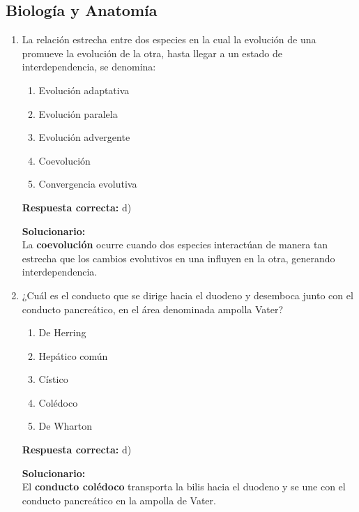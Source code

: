 \subsection*{Biología y Anatomía}

\begin{enumerate}
	
	\item La relación estrecha entre dos especies en la cual la evolución de una promueve la evolución de la otra, hasta llegar a un estado de interdependencia, se denomina:
	\begin{enumerate}[label=\alph*)]
		\item Evolución adaptativa
		\item Evolución paralela
		\item Evolución advergente
		\item Coevolución
		\item Convergencia evolutiva
	\end{enumerate}
	\textbf{Respuesta correcta:} d)
	
	\vspace{2mm}
	\textbf{Solucionario:}\\
	La \textbf{coevolución} ocurre cuando dos especies interactúan de manera tan estrecha que los cambios evolutivos en una influyen en la otra, generando interdependencia.
	
	\vspace{6mm}
	
	\item ¿Cuál es el conducto que se dirige hacia el duodeno y desemboca junto con el conducto pancreático, en el área denominada ampolla Vater?
	\begin{enumerate}[label=\alph*)]
		\item De Herring
		\item Hepático común
		\item Cístico
		\item Colédoco
		\item De Wharton
	\end{enumerate}
	\textbf{Respuesta correcta:} d)
	
	\vspace{2mm}
	\textbf{Solucionario:}\\
	El \textbf{conducto colédoco} transporta la bilis hacia el duodeno y se une con el conducto pancreático en la ampolla de Vater.
	
	\vspace{6mm}
	
\end{enumerate}

